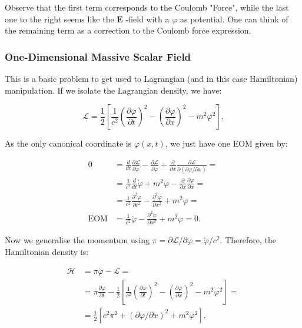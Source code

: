 Observe that the first term corresponds to the Coulomb "Force", while the last one to the right seems like the $\mathbf{E}$ -field with a $\varphi$ as potential. One can think of the remaining term as a correction to the Coulomb force expression.

\subsubsection{One-Dimensional Massive Scalar Field}\label{One-Dimensional Massive Scalar Field}

This is a basic problem to get used to Lagrangian (and in this case Hamiltonian) manipulation. If we isolate the Lagrangian density, we have:

\begin{equation}
	\mathcal{L}=\frac{1}{2}\left[\frac{1}{c^{2}}\left(\frac{\partial \varphi}{\partial t}\right)^{2}-\left(\frac{\partial \varphi}{\partial x}\right)^{2}-m^{2} \varphi^{2}\right].
\end{equation}

As the only canonical coordinate is $\varphi (x,t)$, we just have one EOM given by:

\begin{equation}
	\begin{split}
		0 &=\frac{d}{d t} \frac{\partial \mathcal{L}}{\partial \dot{\varphi}}-\frac{\partial \mathcal{L}}{\partial \varphi}+\frac{\partial}{\partial x} \frac{\partial \mathcal{L}}{\partial(\partial \varphi / \partial x)}= \\
		&=\frac{1}{c^{2}} \frac{d}{d t} \dot{\varphi}+m^{2} \varphi-\frac{\partial}{\partial x} \frac{\partial \varphi}{\partial x}= \\
		&=\frac{1}{c^{2}} \frac{\partial^{2} \varphi}{\partial t^{2}}-\frac{\partial^{2} \varphi}{\partial x^{2}}+m^{2} \varphi =\\
		\text{EOM}&=\frac{1}{c^{2}} \ddot{\varphi}-\frac{\partial^{2} \varphi}{\partial x^{2}}+m^{2} \varphi = 0.
	\end{split}
\end{equation}

Now we generalise the momentum using $\pi=\partial \mathcal{L} / \partial \dot{\varphi}=\dot{\varphi} / c^{2}$. Therefore, the Hamiltonian density is:

\begin{equation}
	\begin{split}
		\mathcal{H} &=\pi \dot{\varphi}-\mathcal{L}= \\
		&=\pi \frac{\partial \varphi}{\partial t}-\frac{1}{2}\left[\frac{1}{c^{2}}\left(\frac{\partial \varphi}{\partial t}\right)^{2}-\left(\frac{\partial \varphi}{\partial x}\right)^{2}-m^{2} \varphi^{2}\right]= \\
		&=\frac{1}{2}\left[c^{2} \pi^{2}+(\partial \varphi / \partial x)^{2}+m^{2} \varphi^{2}\right].
	\end{split}
\end{equation}


